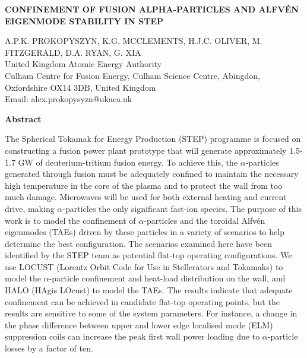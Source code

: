 \documentclass[10pt, a4paper, twoside]{article}
\begin{document}
\begin{flushleft}
\fontsize{12}{14}\selectfont \textbf{CONFINEMENT OF FUSION ALPHA-PARTICLES AND ALFV\'EN EIGENMODE STABILITY IN STEP}

\fontsize{10}{13}\selectfont
A.P.K. PROKOPYSZYN, K.G. MCCLEMENTS, H.J.C. OLIVER, M. FITZGERALD, D.A. RYAN, G. XIA \\
United Kingdom Atomic Energy Authority \\
Culham Centre for Fusion Energy, Culham Science Centre, Abingdon, Oxfordshire OX14 3DB, United Kingdom \\
Email: alex.prokopysyzn@ukaea.uk

\end{flushleft}

\begin{flushleft}
\textbf{Abstract}
\end{flushleft}

\setlength{\parindent}{1cm}
\fontsize{9}{12pt}\selectfont

The Spherical Tokamak for Energy Production (STEP) programme is focused on constructing a fusion power plant prototype that will generate approximately 1.5-1.7 GW of deuterium-tritium fusion energy. To achieve this, the $\alpha$-particles generated through fusion must be adequately confined to maintain the necessary high temperature in the core of the plasma and to protect the wall from too much damage. Microwaves will be used for both external heating and current drive, making $\alpha$-particles the only significant fast-ion species. The purpose of this work is to model the confinement of $\alpha$-particles and the toroidal Alfvén eigenmodes (TAEs) driven by these particles in a variety of scenarios to help determine the best configuration. The scenarios examined here have been identified by the STEP team as potential flat-top operating configurations. We use LOCUST (Lorentz Orbit Code for Use in Stellerators and Tokamaks) to model the $\alpha$-particle confinement and heat-load distribution on the wall, and HALO (HAgis LOcust) to model the TAEs. The results indicate that adequate confinement can be achieved in candidate flat-top operating points, but the results are sensitive to some of the system parameters. For instance, a change in the phase difference between upper and lower edge localised mode (ELM) suppression coils can increase the peak first wall power loading due to $\alpha$-particle losses by a factor of ten.
\end{document}
